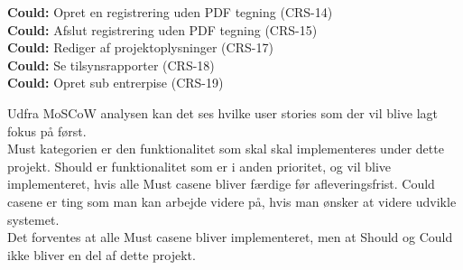 \textbf{Could:} Opret en registrering uden PDF tegning (CRS-14) \\
\textbf{Could:} Afslut registrering uden PDF tegning (CRS-15) \\
\textbf{Could:} Rediger af projektoplysninger (CRS-17) \\
\textbf{Could:} Se tilsynsrapporter (CRS-18) \\
\textbf{Could:} Opret sub entrerpise (CRS-19)

Udfra MoSCoW analysen kan det ses hvilke user stories som der vil blive lagt fokus på først. \\
Must kategorien er den funktionalitet som skal skal implementeres under dette projekt. Should er funktionalitet som er i anden prioritet, og vil blive implementeret, hvis alle Must casene bliver færdige før afleveringsfrist. Could casene er ting som man kan arbejde videre på, hvis man ønsker at videre udvikle systemet. \\
Det forventes at alle Must casene bliver implementeret, men at Should og Could ikke bliver en del af dette projekt.
	